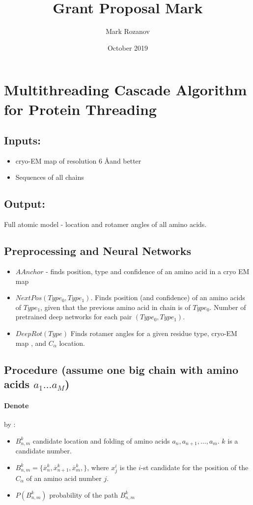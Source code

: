 \documentclass{article}
\title{Grant Proposal Mark}
\author{Mark Rozanov }
\date{October 2019}
\begin{document}
\maketitle

\section{Multithreading Cascade Algorithm for Protein Threading}
\subsection{Inputs:}
\begin{itemize}
    \item cryo-EM map of resolution 6 \AA and better
    \item Sequences of all chains
\end{itemize}
\subsection{Output:}
Full atomic model  - location and rotamer angles of all amino acids.

\subsection{Preprocessing and Neural Networks}
\begin{itemize}
    \item $AAnchor$ - finds position, type  and  confidence of an amino acid in a cryo EM map
    \item $NextPos(Type_0,Type_1)$. Finds position (and confidence) of an amino acids of $Type_1$, given that the previous amino acid in chain is of $Type_0$. Number of pretrained deep networks for each pair $(Type_0,Type_1)$.
    \item $DeepRot(Type)$ Finds rotamer angles for a given residue type, cryo-EM map , and $C_\alpha$ location.    		
\end{itemize}

\subsection{Procedure (assume one big chain with amino acids $a_1 \ldots a_M$)}

\paragraph{Denote} by :\begin{itemize}
 \item $B_{n,m}^k$ candidate  location and folding of amino acids $a_n,a_{n+1},\ldots,a_m$.
 $ k$ is a candidate number.
 \item  $B_{n,m}^k = \{\overline{x}_n^k,\overline{x}_{n+1}^k,\overline{x}_{m}^k,\}$, where $x_j^i$ is the $i$-st candidate for the position of the $C_\alpha$ of an amino acid number $j$.
 \item $P(B_{n,m}^k)$ probability of the path  $B_{n,m}^k$
\end{itemize}
\end{document}

